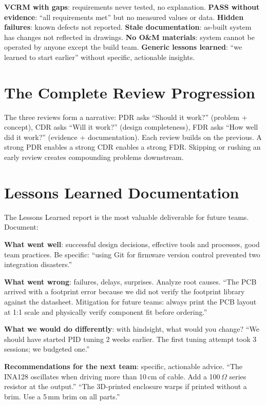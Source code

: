 \documentclass[11pt,letterpaper,twoside,openany]{book}
\begin{document}
\begin{tipbox}
\textbf{VCRM with gaps}: requirements never tested, no explanation. \textbf{PASS without evidence}: ``all requirements met'' but no measured values or data. \textbf{Hidden failures}: known defects not reported. \textbf{Stale documentation}: as-built system has changes not reflected in drawings. \textbf{No O\&M materials}: system cannot be operated by anyone except the build team. \textbf{Generic lessons learned}: ``we learned to start earlier'' without specific, actionable insights.
\end{tipbox}

\section{The Complete Review Progression}
The three reviews form a narrative: PDR asks ``Should it work?'' (problem + concept), CDR asks ``Will it work?'' (design completeness), FDR asks ``How well did it work?'' (evidence + documentation). Each review builds on the previous. A strong PDR enables a strong CDR enables a strong FDR. Skipping or rushing an early review creates compounding problems downstream.

\section{Lessons Learned Documentation}
The Lessons Learned report is the most valuable deliverable for future teams. Document:

\textbf{What went well}: successful design decisions, effective tools and processes, good team practices. Be specific: ``using Git for firmware version control prevented two integration disasters.''

\textbf{What went wrong}: failures, delays, surprises. Analyze root causes. ``The PCB arrived with a footprint error because we did not verify the footprint library against the datasheet. Mitigation for future teams: always print the PCB layout at 1:1 scale and physically verify component fit before ordering.''

\textbf{What we would do differently}: with hindsight, what would you change? ``We should have started PID tuning 2 weeks earlier. The first tuning attempt took 3 sessions; we budgeted one.''

\textbf{Recommendations for the next team}: specific, actionable advice. ``The INA128 oscillates when driving more than 10\,cm of cable. Add a 100\,$\Omega$ series resistor at the output.'' ``The 3D-printed enclosure warps if printed without a brim. Use a 5\,mm brim on all parts.''
\end{document}
